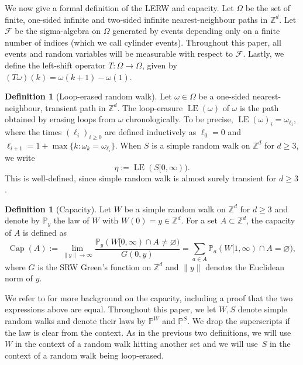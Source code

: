 \documentclass{article}
\DeclareMathOperator{\LE}{LE}
\DeclareMathOperator{\Ca}{Cap}
\newcommand{\Z}{\mathbb{Z}}
\newcommand{\cF}{\mathcal{F}}
\renewcommand{\P}{\mathbb{P}}
\newcommand{\1}{\mathbf{1}}
\renewcommand{\l}{\ell}
\theoremstyle{definition}
\newtheorem{definition}[theorem]{Definition}
\numberwithin{equation}{section}
\numberwithin{theorem}{section}
\begin{document}
We now give a formal definition of the LERW and capacity. Let $\Omega$ be the set of finite, one-sided infinite and two-sided infinite nearest-neighbour paths in $\Z^d$. Let $\cF$ be the sigma-algebra on $\Omega$ generated by events depending only on a finite number of indices (which we call cylinder events). Throughout this paper, all events and random variables will be measurable with respect to $\cF$. Lastly, we define the left-shift operator $T\colon\Omega\to\Omega$, given by $(T\omega)(k)=\omega(k+1)-\omega(1)$.
\begin{definition}[Loop-erased random walk]\label{def:lerw}
Let $\omega\in\Omega$ be a one-sided nearest-neighbour, transient path in $\Z^d$. The loop-erasure $\LE(\omega)$ of $\omega$ is the path obtained by erasing loops from $\omega$ chronologically. To be precise, $\LE(\omega)_i=\omega_{\l_i}$, where the times $(\l_i)_{i\geq0}$ are defined inductively as $\l_0=0$ and $\l_{i+1}=1+\max\{k\colon\omega_k=\omega_{\l_i}\}$. When $S$ is a simple random walk on $\Z^d$ for $d\geq3$, we write
\begin{equation}\label{eq:def-lerw}
	\eta:=\LE(S[0,\infty)).
\end{equation}
This is well-defined, since simple random walk is almost surely transient for $d\geq3$.
\end{definition}
\begin{definition}[Capacity]\label{def:capacity}
Let $W$ be a simple random walk on $\Z^d$ for $d\geq 3$ and denote by $\P_y$ the law of $W$ with $W(0)=y\in\Z^d$. For a set $A\subset\Z^d$, the capacity of $A$ is defined as
\begin{equation}
    \Ca(A):=\lim_{\|y\|\rightarrow\infty}\frac{\P_y(W[0,\infty)\cap A\neq\varnothing)}{G(0,y)}=\sum_{a\in A}\P_a(W[1,\infty)\cap A=\varnothing),
\end{equation}
where $G$ is the SRW Green's function on $\Z^d$ and $\|y\|$ denotes the Euclidean norm of $y$.
\end{definition}
We refer to \cite{lawler2010random} for more background on the capacity, including a proof that the two expressions above are equal. Throughout this paper, we let $W,S$ denote simple random walks and denote their laws by $\P^W$ and $\P^S$. We drop the superscripts if the law is clear from the context. As in the previous two definitions, we will use $W$ in the context of a random walk hitting another set and we will use~$S$ in the context of a random walk being loop-erased.
\end{document}
